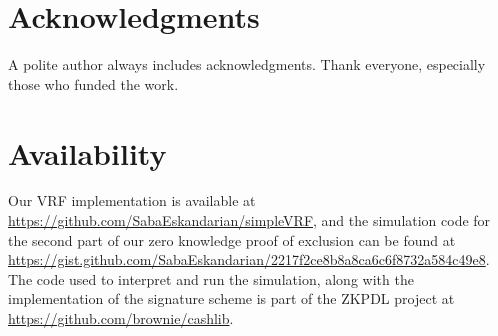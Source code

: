 \documentclass[letterpaper,twocolumn,10pt]{article}
\begin{document}
\section{Acknowledgments}

A polite author always includes acknowledgments.  Thank everyone,
especially those who funded the work. 

\section{Availability}

Our VRF implementation is available at \url{https://github.com/SabaEskandarian/simpleVRF}, and the simulation code for the second part of our zero knowledge proof of exclusion can be found at \url{https://gist.github.com/SabaEskandarian/2217f2ce8b8a8ca6c6f8732a584c49e8}. The code used to interpret and run the simulation, along with the implementation of the signature scheme is part of the ZKPDL project \cite{ZKPDL} at \url{https://github.com/brownie/cashlib}.
\end{document}
